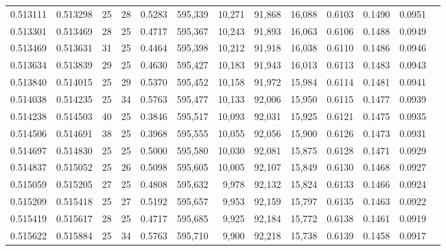 \begin{tabular}{rrrrrrrrrrrrr}
0.513111 & 0.513298 &    25 &  28 &                                     0.5283 & 595,339 &  10,271 &  91,868 &  16,088 & 0.6103 & 0.1490 & 0.0951 \\
0.513301 & 0.513469 &    28 &  25 &                                     0.4717 & 595,367 &  10,243 &  91,893 &  16,063 & 0.6106 & 0.1488 & 0.0949 \\
0.513469 & 0.513631 &    31 &  25 &                                     0.4464 & 595,398 &  10,212 &  91,918 &  16,038 & 0.6110 & 0.1486 & 0.0946 \\
0.513634 & 0.513839 &    29 &  25 &                                     0.4630 & 595,427 &  10,183 &  91,943 &  16,013 & 0.6113 & 0.1483 & 0.0943 \\
0.513840 & 0.514015 &    25 &  29 &                                     0.5370 & 595,452 &  10,158 &  91,972 &  15,984 & 0.6114 & 0.1481 & 0.0941 \\
0.514038 & 0.514235 &    25 &  34 &                                     0.5763 & 595,477 &  10,133 &  92,006 &  15,950 & 0.6115 & 0.1477 & 0.0939 \\
0.514238 & 0.514503 &    40 &  25 &                                     0.3846 & 595,517 &  10,093 &  92,031 &  15,925 & 0.6121 & 0.1475 & 0.0935 \\
0.514506 & 0.514691 &    38 &  25 &                                     0.3968 & 595,555 &  10,055 &  92,056 &  15,900 & 0.6126 & 0.1473 & 0.0931 \\
0.514697 & 0.514830 &    25 &  25 &                                     0.5000 & 595,580 &  10,030 &  92,081 &  15,875 & 0.6128 & 0.1471 & 0.0929 \\
0.514837 & 0.515052 &    25 &  26 &                                     0.5098 & 595,605 &  10,005 &  92,107 &  15,849 & 0.6130 & 0.1468 & 0.0927 \\
0.515059 & 0.515205 &    27 &  25 &                                     0.4808 & 595,632 &   9,978 &  92,132 &  15,824 & 0.6133 & 0.1466 & 0.0924 \\
0.515209 & 0.515418 &    25 &  27 &                                     0.5192 & 595,657 &   9,953 &  92,159 &  15,797 & 0.6135 & 0.1463 & 0.0922 \\
0.515419 & 0.515617 &    28 &  25 &                                     0.4717 & 595,685 &   9,925 &  92,184 &  15,772 & 0.6138 & 0.1461 & 0.0919 \\
0.515622 & 0.515884 &    25 &  34 &                                     0.5763 & 595,710 &   9,900 &  92,218 &  15,738 & 0.6139 & 0.1458 & 0.0917 \\

\end{tabular}
